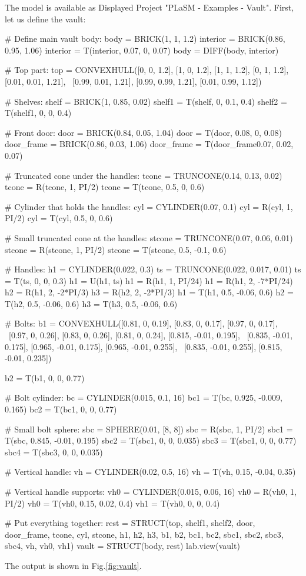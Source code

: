 The model is available as Displayed Project "PLaSM - Examples - Vault". First, let us 
define the vault:

{\small
\begin{bluecode}
# Define main vault body:
body = BRICK(1, 1, 1.2)
interior = BRICK(0.86, 0.95, 1.06)
interior = T(interior, 0.07, 0, 0.07)
body = DIFF(body, interior)

# Top part:
top = CONVEXHULL([0, 0, 1.2], [1, 0, 1.2], [1, 1, 1.2], [0, 1, 1.2], [0.01, 0.01, 1.21], \
                 [0.99, 0.01, 1.21], [0.99, 0.99, 1.21], [0.01, 0.99, 1.12])

# Shelves:
shelf = BRICK(1, 0.85, 0.02)
shelf1 = T(shelf, 0, 0.1, 0.4)
shelf2 = T(shelf1, 0, 0, 0.4)

# Front door:
door = BRICK(0.84, 0.05, 1.04)
door = T(door, 0.08, 0, 0.08)
door_frame = BRICK(0.86, 0.03, 1.06)
door_frame = T(door_frame0.07, 0.02, 0.07)

# Truncated cone under the handles:
tcone = TRUNCONE(0.14, 0.13, 0.02)
tcone = R(tcone, 1, PI/2)
tcone = T(tcone, 0.5, 0, 0.6)

# Cylinder that holds the handles:
cyl = CYLINDER(0.07, 0.1)
cyl = R(cyl, 1, PI/2)
cyl = T(cyl, 0.5, 0, 0.6)

# Small truncated cone at the handles:
stcone = TRUNCONE(0.07, 0.06, 0.01)
stcone = R(stcone, 1, PI/2)
stcone = T(stcone, 0.5, -0.1, 0.6)

# Handles:
h1 = CYLINDER(0.022, 0.3)
ts = TRUNCONE(0.022, 0.017, 0.01)
ts = T(ts, 0, 0, 0.3)
h1 = U(h1, ts)
h1 = R(h1, 1, PI/24)
h1 = R(h1, 2, -7*PI/24)
h2 = R(h1, 2, -2*PI/3)
h3 = R(h2, 2, -2*PI/3)
h1 = T(h1, 0.5, -0.06, 0.6)
h2 = T(h2, 0.5, -0.06, 0.6)
h3 = T(h3, 0.5, -0.06, 0.6)

# Bolts:
b1 = CONVEXHULL([0.81, 0, 0.19], [0.83, 0, 0.17], [0.97, 0, 0.17], \ 
[0.97, 0, 0.26], [0.83, 0, 0.26], [0.81, 0, 0.24], [0.815, -0.01, 0.195], \
[0.835, -0.01, 0.175], [0.965, -0.01, 0.175], [0.965, -0.01, 0.255], \
[0.835, -0.01, 0.255], [0.815, -0.01, 0.235])

b2 = T(b1, 0, 0, 0.77)

# Bolt cylinder:
bc = CYLINDER(0.015, 0.1, 16)
bc1 = T(bc, 0.925, -0.009, 0.165)
bc2 = T(bc1, 0, 0, 0.77)

# Small bolt sphere:
sbc = SPHERE(0.01, [8, 8])
sbc = R(sbc, 1, PI/2)
sbc1 = T(sbc, 0.845, -0.01, 0.195)
sbc2 = T(sbc1, 0, 0, 0.035)
sbc3 = T(sbc1, 0, 0, 0.77)
sbc4 = T(sbc3, 0, 0, 0.035)

# Vertical handle:
vh = CYLINDER(0.02, 0.5, 16)
vh = T(vh, 0.15, -0.04, 0.35)

# Vertical handle supports:
vh0 = CYLINDER(0.015, 0.06, 16)
vh0 = R(vh0, 1, PI/2)
vh0 = T(vh0, 0.15, 0.02, 0.4)
vh1 = T(vh0, 0, 0, 0.4)

# Put everything together:
rest = STRUCT(top, shelf1, shelf2, door, door_frame, tcone, cyl, stcone, 
              h1, h2, h3, b1, b2, bc1, bc2, sbc1, sbc2, sbc3, sbc4, vh, vh0, vh1)
vault = STRUCT(body, rest)
lab.view(vault)
\end{bluecode}
}
\index{ROTATE}
\index{CYLINDER}
\index{UNION}
\noindent
The output is shown in Fig.\ref{fig:vault}.
\newpage

